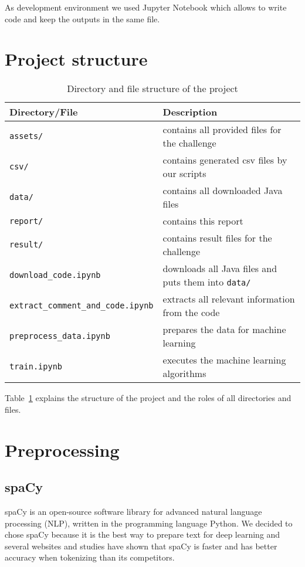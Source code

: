 \documentclass[runningheads]{llncs}
\begin{document}
As development environment we used Jupyter Notebook \cite{ref_jupyter} which allows to write code and keep the outputs in the same file.


\section{Project structure}\label{chapter:structure}
\begin{table}[]
\centering
\begin{tabular}{|l|l|}
\hline
\rowcolor[HTML]{C0C0C0} 
\textbf{Directory/File} & \textbf{Description} \\ \hline
\texttt{assets/} & contains all provided files for the challenge \\ \hline
\texttt{csv/} & contains generated csv files by our scripts \\ \hline
\texttt{data/} & contains all downloaded Java files \\ \hline
\texttt{report/} & contains this report \\ \hline
\texttt{result/} & contains result files for the challenge \\ \hline
\texttt{download\_code.ipynb} & downloads all Java files and puts them into \texttt{data/} \\ \hline
\texttt{extract\_comment\_and\_code.ipynb} & extracts all relevant information from the code \\ \hline
\texttt{preprocess\_data.ipynb} & prepares the data for machine learning \\ \hline
\texttt{train.ipynb} & executes the machine learning algorithms \\ \hline
\end{tabular}
\caption{Directory and file structure of the project}
\label{tab:structure}
\end{table}

Table~\ref{tab:structure} explains the structure of the project and the roles of all directories and files.


\section{Preprocessing}\label{chapter:preprocessing}
\subsection{spaCy}
spaCy \cite{ref_spacy} is an open-source software library for advanced natural language processing (NLP), written in the programming language Python.
We decided to chose spaCy because it is the best way to prepare text for deep learning \cite{ref_spacy_facts} and several websites and studies \cite{ref_choi} have shown that spaCy is faster and has better accuracy when tokenizing than its competitors.
\end{document}
